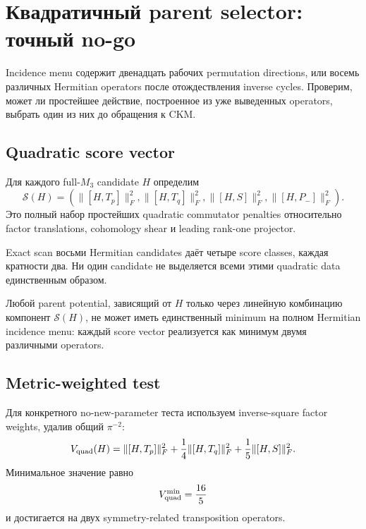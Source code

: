 \chapter{Квадратичный parent selector: точный no-go}

Incidence menu содержит двенадцать рабочих permutation directions, или восемь
различных Hermitian operators после отождествления inverse cycles. Проверим,
может ли простейшее действие, построенное из уже выведенных operators,
выбрать один из них до обращения к CKM.

\section{Quadratic score vector}

Для каждого full-\(M_3\) candidate \(H\) определим
\begin{equation}
\mathcal S(H)=
\left(
\|[H,T_p]\|_F^2,
\|[H,T_q]\|_F^2,
\|[H,S]\|_F^2,
\|[H,P_-]\|_F^2
\right).
\end{equation}
Это полный набор простейших quadratic commutator penalties относительно
factor translations, cohomology shear и leading rank-one projector.

Exact scan восьми Hermitian candidates даёт четыре score classes, каждая
кратности два. Ни один candidate не выделяется всеми этими quadratic data
единственным образом.

\begin{theorem}
Любой parent potential, зависящий от \(H\) только через линейную комбинацию
компонент \(\mathcal S(H)\), не может иметь единственный minimum на полном
Hermitian incidence menu: каждый score vector реализуется как минимум двумя
различными operators.
\end{theorem}

\section{Metric-weighted test}

Для конкретного no-new-parameter теста используем inverse-square factor
weights, удалив общий \(\pi^{-2}\):
\begin{equation}
V_{\rm quad}(H)=
\|[H,T_p]\|_F^2
+\frac14\|[H,T_q]\|_F^2
+\frac15\|[H,S]\|_F^2.
\end{equation}
Минимальное значение равно
\begin{equation}
V_{\rm quad}^{\min}=\frac{16}{5}
\end{equation}
и достигается на двух symmetry-related transposition operators.

